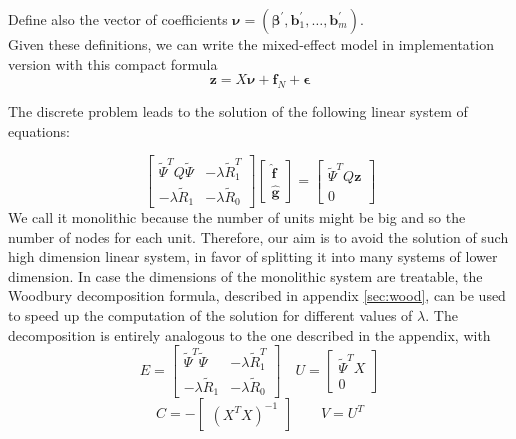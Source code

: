 Define also the vector of coefficients $\bm{\nu} = (\bm{\beta}^\prime, \bm{b}_1^\prime, \dots, \bm{b}_m^\prime)$.\\
Given these definitions, we can write the mixed-effect model in implementation version with this compact formula
\begin{equation}
    \label{modelX}
    \bm{z} = X \bm{\nu} + \bm{f}_N + \bm{\epsilon}
\end{equation}

The discrete problem leads to the solution of the following linear system of equations:

\begin{equation}
    \label{mono}
    \begin{bmatrix}
        \tilde{\Psi}^TQ\tilde{\Psi} & -\lambda \tilde{R}_1^T\\
        -\lambda \tilde{R}_1  & -\lambda \tilde{R}_0
    \end{bmatrix}
    \begin{bmatrix}
        \hat{\mathbf{f}}\\
        \hat{\mathbf{g}}
    \end{bmatrix}
    = 
    \begin{bmatrix}
        \tilde{\Psi}^T Q\mathbf{z}\\
        0
    \end{bmatrix}
\end{equation}
We call it monolithic because the number of units might be big and so the number of nodes for each unit. Therefore, our aim is to avoid the solution of such high dimension linear system, in favor of splitting it into many systems of lower dimension.
In case the dimensions of the monolithic system are treatable, the Woodbury decomposition formula, described in appendix \ref{sec:wood}, can be used to speed up the computation of the solution for different values of $\lambda$. The decomposition is entirely analogous to the one described in the appendix, with
\begin{equation}
    \label{eq:wootilde}
    E =
    \begin{bmatrix}
        \tilde{\Psi}^T\tilde{\Psi} & -\lambda \tilde{R}_1^T\\
        -\lambda \tilde{R}_1  & -\lambda \tilde{R}_0
    \end{bmatrix}
\quad
    U = 
    \begin{bmatrix}
        \tilde{\Psi}^TX\\
        0
    \end{bmatrix}
\end{equation}
\begin{equation*}
    C = -
    \begin{bmatrix}
        \left(X^TX\right)^{-1}
    \end{bmatrix}
\quad \quad
    V = U^T
\end{equation*}

